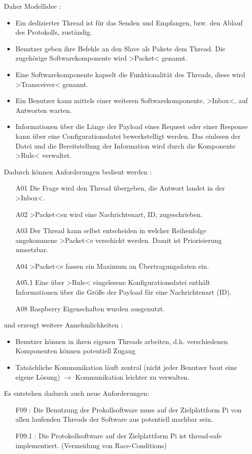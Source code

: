 Daher Modellidee :
\begin{itemize}
	\item Ein dedizierter Thread ist für das Senden und Empfangen, bzw. den Ablauf des Protokolls, zuständig.
	\item Benutzer geben ihre Befehle an den Slave als Pakete dem Thread. Die zugehörige Softwarekomponente wird >Packet< genannt.
	\item Eine Softwarekomponente kapselt die Funktionalität des Threads, diese wird >Transceiver< genannt.
	\item Ein Benutzer kann mittels einer weiteren Softwarekomponente, >Inbox<, auf Antworten warten.
	\item Informationen über die Länge der Payload eines Request oder einer Response kann über eine Configurationsdatei bewerkstelligt werden. Das einlesen der Datei und die Bereitstellung der Information wird durch die Komponente >Rule< verwaltet.
\end{itemize}

Dadurch können Anforderungen bedient werden :
\begin{itemize}
	\item [A01] Die Frage wird den Thread übergeben, die Antwort landet in der >Inbox<.
	\item [A02] >Packet<en wird eine Nachrichtenart, ID, zugeschrieben.
	\item [A03] Der Thread kann selbst entscheiden in welcher Reihenfolge angekommene >Packet<e verschickt werden. Damit ist Priorisierung umsetzbar.
	\item [A04] >Packet<e fassen ein Maximum an Übertragungsdaten ein.
	\item [A05.1] Eine über >Rule< eingelesene Konfigurationsdatei enthält Informationen über die Größe der Payload für eine Nachrichtenart (ID).
	\item [A08] Raspberry Eigenschaften wurden ausgenutzt.
\end{itemize}

und erzeugt weitere Annehmlichkeiten : 
\begin{itemize}
	\item Benutzer können in ihren eigenen Threads arbeiten, d.h. verschiedenen Komponenten können potentiell Zugang
	\item Tatsächliche Kommunikation läuft zentral (nicht jeder Benutzer baut eine eigene Lösung) $\rightarrow$ Kommunikation leichter zu verwalten. 
\end{itemize}
Es entstehen dadurch auch neue Anforderungen:
\begin{itemize}
	\item	[F09] : Die Benutzung der Prokollsoftware muss auf der Zielplattform Pi von allen laufenden Threads der Software aus potentiell machbar sein.
	\item	[F09.1] : Die Protokollsoftware auf der Zielplattform Pi ist thread-safe implementiert. (Vermeidung von Race-Conditions)
\end{itemize}

